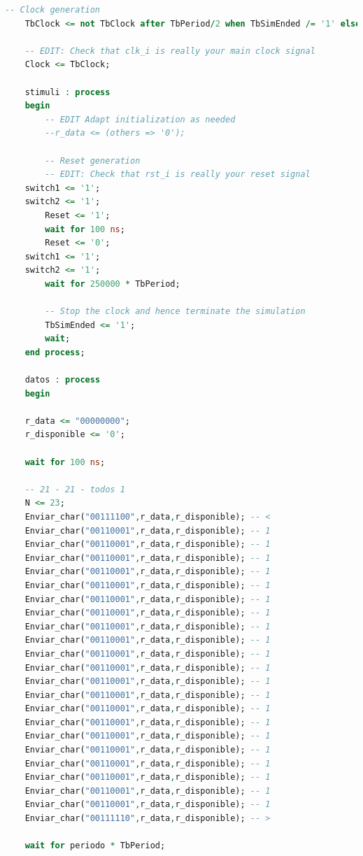 \begin{lstlisting}[language = vhdl,caption=Testbench del módulo enclavamiento,label={lst:test_separador}]
    -- Clock generation
    TbClock <= not TbClock after TbPeriod/2 when TbSimEnded /= '1' else '0';

    -- EDIT: Check that clk_i is really your main clock signal
    Clock <= TbClock;

    stimuli : process
    begin
        -- EDIT Adapt initialization as needed
        --r_data <= (others => '0');

        -- Reset generation
        -- EDIT: Check that rst_i is really your reset signal
	switch1 <= '1';
	switch2 <= '1';
        Reset <= '1';
        wait for 100 ns;
        Reset <= '0';
	switch1 <= '1';
	switch2 <= '1';
        wait for 250000 * TbPeriod;

        -- Stop the clock and hence terminate the simulation
        TbSimEnded <= '1';
        wait;
    end process;

    datos : process
    begin
        
	r_data <= "00000000";
	r_disponible <= '0';

	wait for 100 ns;

	-- 21 - 21 - todos 1
	N <= 23; 	
	Enviar_char("00111100",r_data,r_disponible); -- < 	
	Enviar_char("00110001",r_data,r_disponible); -- 1 	
	Enviar_char("00110001",r_data,r_disponible); -- 1
 	Enviar_char("00110001",r_data,r_disponible); -- 1 	
	Enviar_char("00110001",r_data,r_disponible); -- 1
	Enviar_char("00110001",r_data,r_disponible); -- 1 	
	Enviar_char("00110001",r_data,r_disponible); -- 1
	Enviar_char("00110001",r_data,r_disponible); -- 1 	
	Enviar_char("00110001",r_data,r_disponible); -- 1
	Enviar_char("00110001",r_data,r_disponible); -- 1 	
	Enviar_char("00110001",r_data,r_disponible); -- 1
	Enviar_char("00110001",r_data,r_disponible); -- 1 	
	Enviar_char("00110001",r_data,r_disponible); -- 1
	Enviar_char("00110001",r_data,r_disponible); -- 1 	
	Enviar_char("00110001",r_data,r_disponible); -- 1
	Enviar_char("00110001",r_data,r_disponible); -- 1 	
	Enviar_char("00110001",r_data,r_disponible); -- 1
	Enviar_char("00110001",r_data,r_disponible); -- 1 	
	Enviar_char("00110001",r_data,r_disponible); -- 1
	Enviar_char("00110001",r_data,r_disponible); -- 1 	
	Enviar_char("00110001",r_data,r_disponible); -- 1
	Enviar_char("00110001",r_data,r_disponible); -- 1 	
	Enviar_char("00111110",r_data,r_disponible); -- >

	wait for periodo * TbPeriod;


\end{lstlisting}
